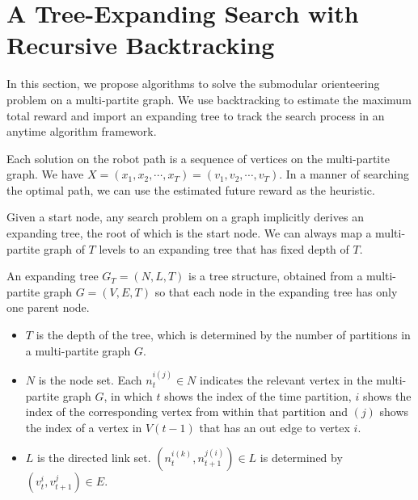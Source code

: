 \documentclass[12pt]{article}
\begin{document}
\section{A Tree-Expanding Search with Recursive Backtracking}
\label{sec:tree_expanding_search}

In this section, we propose algorithms to solve the submodular orienteering problem on a multi-partite graph.
We use backtracking to estimate the maximum total reward and import an expanding tree to track the search process in an anytime algorithm framework. 

Each solution on the robot path is a sequence of vertices on the multi-partite graph.
We have $ X = ( x_{1}, x_{2} , \cdots , x_{T} ) = ( v_{1}, v_{2} , \cdots , v_{T} ) $.
In a manner of searching the optimal path, we can use the estimated future reward as the heuristic.

Given a start node, any search problem on a graph implicitly derives an expanding tree, the root of which is the start node.
We can always map a multi-partite graph of $ T $ levels to an expanding tree that has fixed depth of $ T $. 

\begin{mydef}
\label{def:expanding_tree}
An expanding tree $ G_{T} = (N, L, T) $ is a tree structure, obtained from a multi-partite graph $ G = (V, E, T) $ so that each node in the expanding tree has only one parent node.
\begin{itemize}
\item $ T $ is the depth of the tree, which is determined by the number of partitions in a multi-partite graph $ G $.
\item $ N $ is the node set. Each $ n_{t}^{i(j)} \in N $ indicates the relevant vertex in the multi-partite graph $ G $, in which $ t $ shows the index of the time partition, $ i $ shows the index of the corresponding vertex from within that partition and $ (j) $ shows the index of a vertex in $ V(t-1) $ that has an out edge to vertex $ i $.
\item $ L $ is the directed link set. $ (n^{i(k)}_{t}, n^{j(i)}_{t+1})  \in L $ is determined by $ (v^{i}_{t}, v^{j}_{t+1} ) \in E $.

\end{itemize}
\end{mydef}
\end{document}
